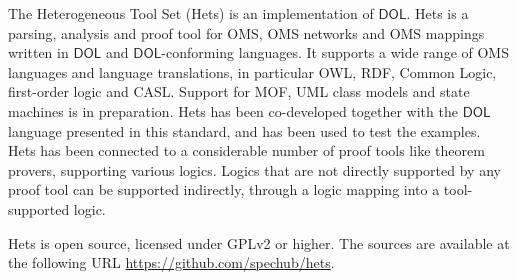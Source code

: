 \documentclass[10pt, a4paper]{isov2}
\newcommand*{\DOL}{\ensuremath{\mathsf{DOL}}\xspace}
\begin{document}


\cleardoublepage
\infannex{Tools for \DOL}\label{a:tools}


\label{a:hets} The
Heterogeneous Tool Set (Hets) is  an implementation  of
\DOL. Hets is a parsing, analysis and proof tool
for OMS, OMS networks and OMS mappings written in \DOL and
\DOL-conforming languages.  It supports a wide range of OMS languages
and language translations, in particular OWL, RDF, Common Logic,
first-order logic and CASL. Support for MOF, UML class models and
state machines is in preparation.  Hets has been co-developed together
with the \DOL language presented in this standard, and has been used to
test the examples. Hets has been connected to a considerable number of
proof tools like theorem provers, supporting various logics. Logics
that are not directly supported by any proof tool can be supported
indirectly, through a logic mapping into a tool-supported logic.

Hets  is open source, licensed under GPLv2 or higher. The sources are
available at the following URL \url{https://github.com/spechub/hets}.

\end{document}
